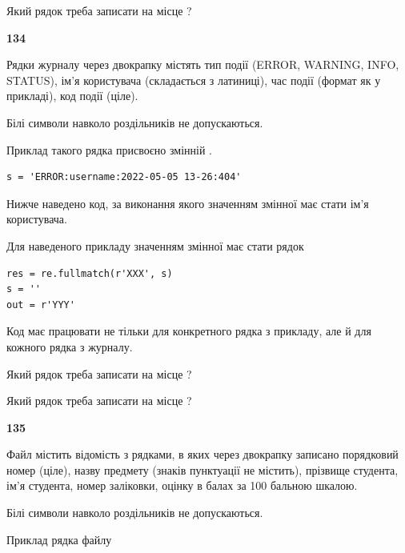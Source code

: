 Який рядок треба записати на місце  ?\par


\newpage

{\begin {center}\textbf{ 134}\end {center}}\par
Рядки журналу через двокрапку містять тип події (ERROR, WARNING, INFO, STATUS), ім'я користувача (складається з латиниці), час події (фор\-мат як у прикладі), код події (ціле).

Білі символи навколо роздільників не допускаються.

Приклад такого рядка присвоєно змінній .



\begin{verbatim}
s = 'ERROR:username:2022-05-05 13-26:404'
\end{verbatim}


Нижче наведено код, за виконання якого значенням змінної  має стати ім'я користувача.

Для наведеного прикладу значенням змінної  має стати рядок 



\begin{verbatim}
res = re.fullmatch(r'XXX', s)
s = ''
out = r'YYY'
\end{verbatim}


Код має працювати не тільки для конкретного рядка з прикладу, але й для кожного рядка з журналу.




Який рядок треба записати на місце  ?\par
\vspace{5mm}


Який рядок треба записати на місце  ?\par


\newpage

{\begin {center}\textbf{ 135}\end {center}}\par
Файл  містить відомість з рядками, в яких через двокрапку записа\-но поряд\-ковий номер (ціле), назву предмету (знаків пунктуації не містить), прізвище студента, ім'я студента, номер заліковки, оцінку в балах за 100 бальною шкалою.

Білі символи навколо роздільників не допускаються.

Приклад рядка файлу



